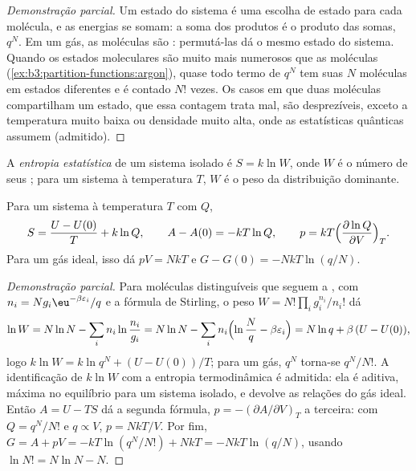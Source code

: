 \begin{proof}[Demonstração parcial]
Um estado do sistema é uma escolha de estado para cada molécula, e as energias
se somam: a soma dos produtos é o produto das somas, $q^N$. Em um gás, as
moléculas são : permutá-las dá o mesmo estado do sistema. Quando
os estados moleculares são muito mais numerosos que as moléculas
(\cref{ex:b3:partition-functions:argon}), quase todo termo de $q^N$ tem suas $N$
moléculas em estados diferentes e é contado $N!$ vezes. Os casos em que duas
moléculas compartilham um estado, que essa contagem trata mal, são desprezíveis,
exceto a temperatura muito baixa ou densidade muito alta, onde as estatísticas
quânticas assumem (admitido).
\end{proof}

\begin{definition}\label{def:b3:partition-functions:statistical-entropy}
A \emph{entropia estatística} de um sistema isolado é
$S = k\ln W$, onde $W$ é o número de seus ; para um sistema à
temperatura $T$, $W$ é o peso da distribuição dominante.
\end{definition}

\begin{theorem}\label{thm:b3:partition-functions:entropy}
Para um sistema à temperatura $T$ com  $Q$,
\[
  S = \frac{U - U(0)}{T} + k\ln Q, \qquad A - A(0) = -kT\ln Q, \qquad
  p = kT\Bigl(\frac{\partial\ln Q}{\partial V}\Bigr)_T .
\]
Para um gás ideal, isso dá $pV = NkT$ e $G - G(0) = -NkT\ln(q/N)$.
\end{theorem}

\begin{proof}[Demonstração parcial]
Para moléculas distinguíveis que seguem a , com $n_i = Ng_i\eu^{-\beta\varepsilon_i}/q$
e a fórmula de Stirling, o peso $W = N!\prod_ig_i^{n_i}/n_i!$ dá
\[
  \ln W = N\ln N - \sum_in_i\ln\frac{n_i}{g_i} = N\ln N - \sum_in_i\Bigl(\ln\frac Nq - \beta\varepsilon_i\Bigr)
        = N\ln q + \beta\,(U - U(0)),
\]
logo $k\ln W = k\ln q^N + (U - U(0))/T$; para um gás, $q^N$ torna-se $q^N/N!$. A
identificação de $k\ln W$ com a entropia termodinâmica é admitida: ela é
aditiva, máxima no equilíbrio para um sistema isolado, e devolve as relações
do gás ideal. Então $A = U - TS$ dá a segunda fórmula, $p =
-(\partial A/\partial V)_T$ a terceira: com $Q = q^N/N!$ e $q \propto V$, $p = NkT/V$. Por fim,
$G = A + pV = -kT\ln(q^N/N!) + NkT = -NkT\ln(q/N)$, usando $\ln N! = N\ln N - N$.
\end{proof}

